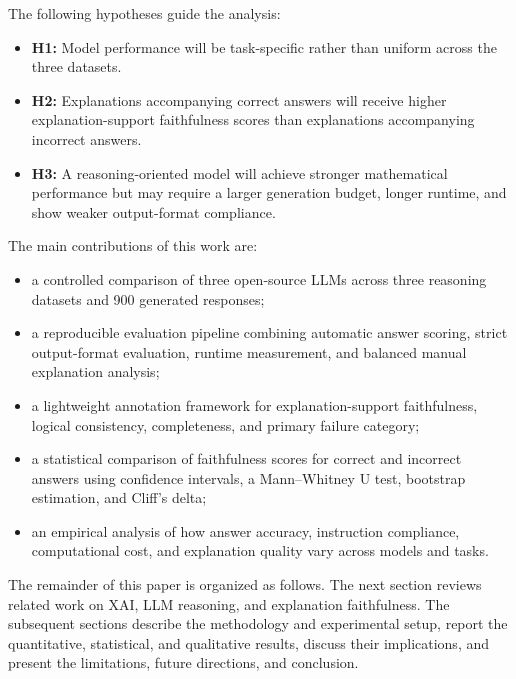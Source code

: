 \documentclass{article}
\begin{document}
The following hypotheses guide the analysis:

\begin{itemize}
    \item \textbf{H1:} Model performance will be task-specific rather
    than uniform across the three datasets.

    \item \textbf{H2:} Explanations accompanying correct answers will
    receive higher explanation-support faithfulness scores than
    explanations accompanying incorrect answers.

    \item \textbf{H3:} A reasoning-oriented model will achieve stronger
    mathematical performance but may require a larger generation budget,
    longer runtime, and show weaker output-format compliance.
\end{itemize}

The main contributions of this work are:

\begin{itemize}
    \item a controlled comparison of three open-source LLMs across three
    reasoning datasets and 900 generated responses;

    \item a reproducible evaluation pipeline combining automatic answer
    scoring, strict output-format evaluation, runtime measurement, and
    balanced manual explanation analysis;

    \item a lightweight annotation framework for explanation-support
    faithfulness, logical consistency, completeness, and primary failure
    category;

    \item a statistical comparison of faithfulness scores for correct
    and incorrect answers using confidence intervals, a Mann--Whitney
    U test, bootstrap estimation, and Cliff's delta;

    \item an empirical analysis of how answer accuracy, instruction
    compliance, computational cost, and explanation quality vary across
    models and tasks.
\end{itemize}

The remainder of this paper is organized as follows. The next section
reviews related work on XAI, LLM reasoning, and explanation
faithfulness. The subsequent sections describe the methodology and
experimental setup, report the quantitative, statistical, and
qualitative results, discuss their implications, and present the
limitations, future directions, and conclusion.
\end{document}
